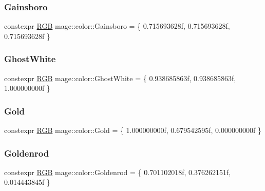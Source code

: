\subsubsection{\texorpdfstring{Gainsboro}{Gainsboro}}
{\footnotesize\ttfamily constexpr \hyperlink{structmage_1_1_r_g_b}{R\+GB} mage\+::color\+::\+Gainsboro = \{ 0.\+715693628f, 0.\+715693628f, 0.\+715693628f \}}

\hypertarget{namespacemage_1_1color_a6e3a848fd12f965953fa38d355e20ab5}{}\label{namespacemage_1_1color_a6e3a848fd12f965953fa38d355e20ab5} 
\subsubsection{\texorpdfstring{Ghost\+White}{GhostWhite}}
{\footnotesize\ttfamily constexpr \hyperlink{structmage_1_1_r_g_b}{R\+GB} mage\+::color\+::\+Ghost\+White = \{ 0.\+938685863f, 0.\+938685863f, 1.\+000000000f \}}

\hypertarget{namespacemage_1_1color_a72d35eacf778a3576ddb3d3c4d8930f0}{}\label{namespacemage_1_1color_a72d35eacf778a3576ddb3d3c4d8930f0} 
\subsubsection{\texorpdfstring{Gold}{Gold}}
{\footnotesize\ttfamily constexpr \hyperlink{structmage_1_1_r_g_b}{R\+GB} mage\+::color\+::\+Gold = \{ 1.\+000000000f, 0.\+679542595f, 0.\+000000000f \}}

\hypertarget{namespacemage_1_1color_aebd4f6050ceb4c380fc13cc7d3302888}{}\label{namespacemage_1_1color_aebd4f6050ceb4c380fc13cc7d3302888} 
\subsubsection{\texorpdfstring{Goldenrod}{Goldenrod}}
{\footnotesize\ttfamily constexpr \hyperlink{structmage_1_1_r_g_b}{R\+GB} mage\+::color\+::\+Goldenrod = \{ 0.\+701102018f, 0.\+376262151f, 0.\+014443845f \}}

\hypertarget{namespacemage_1_1color_a43f3c4cf9713fb15ed89dec2c9d26556}{}\label{namespacemage_1_1color_a43f3c4cf9713fb15ed89dec2c9d26556} 
